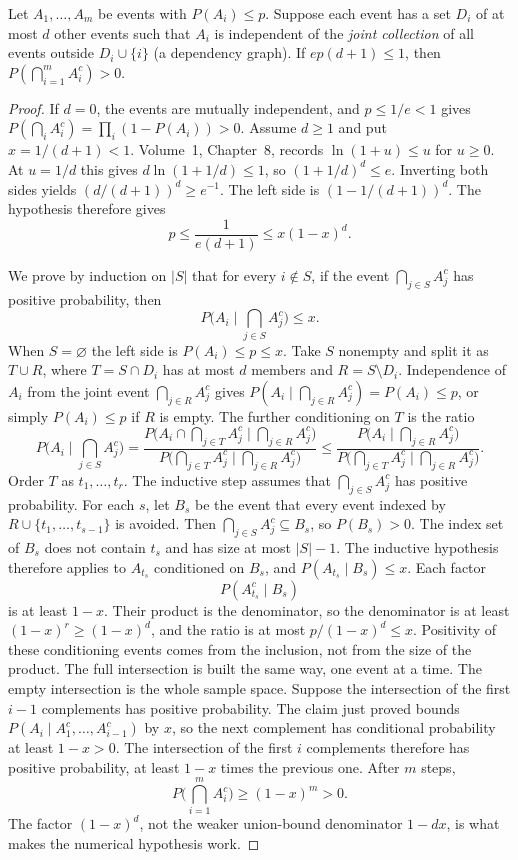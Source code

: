 \begin{theorem}\label{thm:lll}
Let $A_1,\ldots,A_m$ be events with $P(A_i)\le p$. Suppose each event has a set $D_i$ of at most $d$ other events such that $A_i$ is independent of the \emph{joint collection} of all events outside $D_i\cup\{i\}$ (a dependency graph). If $ep(d+1)\le1$, then $P(\bigcap_{i=1}^m A_i^c)>0$.
\end{theorem}
\begin{proof}
If $d=0$, the events are mutually independent, and $p\le1/e<1$ gives $P(\bigcap_iA_i^c)=\prod_i(1-P(A_i))>0$. Assume $d\ge1$ and put $x=1/(d+1)<1$. Volume~1, Chapter~8, records $\ln(1+u)\le u$ for $u\ge0$. At $u=1/d$ this gives $d\ln(1+1/d)\le 1$, so $(1+1/d)^d\le e$. Inverting both sides yields $(d/(d+1))^d\ge e^{-1}$. The left side is $(1-1/(d+1))^d$. The hypothesis therefore gives
\[
 p\le\frac1{e(d+1)}\le x(1-x)^d.
\]

We prove by induction on $|S|$ that for every $i\notin S$, if the event $\bigcap_{j\in S}A_j^c$ has positive probability, then
\[
 P\bigl(A_i\mid\bigcap_{j\in S}A_j^c\bigr)\le x.
\]
When $S=\varnothing$ the left side is $P(A_i)\le p\le x$. Take $S$ nonempty and split it as $T\cup R$, where $T=S\cap D_i$ has at most $d$ members and $R=S\setminus D_i$. Independence of $A_i$ from the joint event $\bigcap_{j\in R}A_j^c$ gives $P(A_i\mid\bigcap_{j\in R}A_j^c)=P(A_i)\le p$, or simply $P(A_i)\le p$ if $R$ is empty. The further conditioning on $T$ is the ratio
\[
 P\bigl(A_i\mid\bigcap_{j\in S}A_j^c\bigr)
 =\frac{P\bigl(A_i\cap\bigcap_{j\in T}A_j^c\mid\bigcap_{j\in R}A_j^c\bigr)}
 {P\bigl(\bigcap_{j\in T}A_j^c\mid\bigcap_{j\in R}A_j^c\bigr)}
 \le\frac{P\bigl(A_i\mid\bigcap_{j\in R}A_j^c\bigr)}
 {P\bigl(\bigcap_{j\in T}A_j^c\mid\bigcap_{j\in R}A_j^c\bigr)}.
\]
Order $T$ as $t_1,\ldots,t_r$. The inductive step assumes that $\bigcap_{j\in S}A_j^c$ has positive probability. For each $s$, let $B_s$ be the event that every event indexed by $R\cup\{t_1,\ldots,t_{s-1}\}$ is avoided. Then $\bigcap_{j\in S}A_j^c\subseteq B_s$, so $P(B_s)>0$. The index set of $B_s$ does not contain $t_s$ and has size at most $|S|-1$. The inductive hypothesis therefore applies to $A_{t_s}$ conditioned on $B_s$, and $P(A_{t_s}\mid B_s)\le x$. Each factor
\[
 P(A_{t_s}^c\mid B_s)
\]
is at least $1-x$. Their product is the denominator, so the denominator is at least $(1-x)^r\ge(1-x)^d$, and the ratio is at most $p/(1-x)^d\le x$. Positivity of these conditioning events comes from the inclusion, not from the size of the product. The full intersection is built the same way, one event at a time. The empty intersection is the whole sample space. Suppose the intersection of the first $i-1$ complements has positive probability. The claim just proved bounds $P(A_i\mid A_1^c,\ldots,A_{i-1}^c)$ by $x$, so the next complement has conditional probability at least $1-x>0$. The intersection of the first $i$ complements therefore has positive probability, at least $1-x$ times the previous one. After $m$ steps,
\[
P\bigl(\bigcap_{i=1}^m A_i^c\bigr)\ge(1-x)^m>0.
\]
The factor $(1-x)^d$, not the weaker union-bound denominator $1-dx$, is what makes the numerical hypothesis work.
\end{proof}

